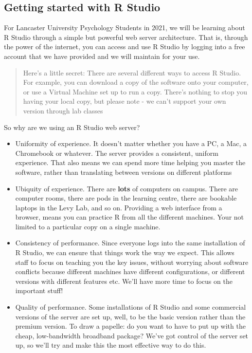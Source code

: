 \documentclass[
]{book}
\begin{document}
\hypertarget{getting_started}{%
\subsection{Getting started with R Studio}\label{getting_started}}

For Lancaster University Psychology Students in 2021, we will be learning about R Studio through a simple but powerful web server architecture. That is, through the power of the internet, you can access and use R Studio by logging into a free account that we have provided and we will maintain for your use.

\begin{quote}
Here's a little secret: There are several different ways to access R Studio. For example, you can download a copy of the software onto your computer, or use a Virtual Machine set up to run a copy. There's nothing to stop you having your local copy, but please note - we can't support your own version through lab classes
\end{quote}

So why are we using an R Studio web server?

\begin{itemize}
\item
  Uniformity of experience. It doesn't matter whether you have a PC, a Mac, a Chromebook or whatever. The server provides a consistent, uniform experience. That also means we can spend more time helping you master the software, rather than translating between versions on different platforms
\item
  Ubiquity of experience. There are \textbf{lots} of computers on campus. There are computer rooms, there are pods in the learning centre, there are bookable laptops in the Levy Lab, and so on. Providing a web interface from a browser, means you can practice R from all the different machines. Your not limited to a particular copy on a single machine.
\item
  Consistency of performance. Since everyone logs into the same installation of R Studio, we can ensure that things work the way we expect. This allows staff to focus on teaching you the key issues, without worrying about software conflicts because different machines have different configurations, or different versions with different features etc. We'll have more time to focus on the important stuff!
\item
  Quality of performance. Some installations of R Studio and some commercial versions of the server are set up, well, to be the basic version rather than the premium version. To draw a papelle: do you want to have to put up with the cheap, low-bandwidth broadband package? We've got control of the server set up, so we'll try and make this the most effective way to do this.
\end{itemize}
\end{document}
